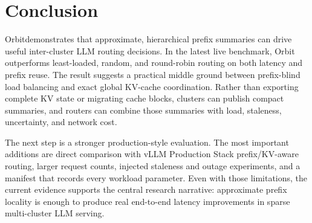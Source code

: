 \documentclass[10pt,twocolumn]{article}
\newcommand{\sys}{Orbit}
\begin{document}
\section{Conclusion}

\sys demonstrates that approximate, hierarchical prefix summaries can drive useful inter-cluster LLM routing decisions. In the latest live benchmark, Orbit outperforms least-loaded, random, and round-robin routing on both latency and prefix reuse. The result suggests a practical middle ground between prefix-blind load balancing and exact global KV-cache coordination. Rather than exporting complete KV state or migrating cache blocks, clusters can publish compact summaries, and routers can combine those summaries with load, staleness, uncertainty, and network cost.

The next step is a stronger production-style evaluation. The most important additions are direct comparison with vLLM Production Stack prefix/KV-aware routing, larger request counts, injected staleness and outage experiments, and a manifest that records every workload parameter. Even with those limitations, the current evidence supports the central research narrative: approximate prefix locality is enough to produce real end-to-end latency improvements in sparse multi-cluster LLM serving.
\end{document}
